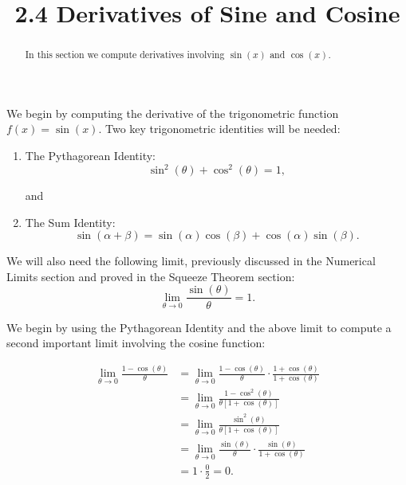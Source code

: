 \documentclass{ximera}
\title{2.4 Derivatives of Sine and Cosine}
\begin{document}
\begin{abstract}
In this section we compute derivatives involving $\sin(x)$ and $\cos(x)$.
\end{abstract}

\maketitle


We begin by computing the derivative of the trigonometric function $f(x) = \sin(x)$.  
Two key trigonometric identities will be needed:
\begin{enumerate}
\item The Pythagorean Identity:
\[
\sin^2(\theta) + \cos^2(\theta) = 1,
\]
\begin{center}
and
\end{center}
\item The Sum Identity:
\[
\sin(\alpha + \beta) = \sin(\alpha)\cos(\beta) + \cos(\alpha)\sin(\beta).
\]
\end{enumerate}

We will also need the following limit, previously discussed in the Numerical Limits section and proved in the Squeeze Theorem section:
\[
\lim_{\theta \to 0} \frac{\sin(\theta)}{\theta} = 1.
\]

We begin by using  the Pythagorean Identity and the above limit
to compute a second important limit involving the cosine function:

\begin{align*}
\lim_{\theta \to 0} \frac{1 - \cos(\theta)}{\theta} &= \lim_{\theta \to 0} \frac{1 - \cos(\theta)}{\theta} \cdot \frac{1 + \cos(\theta)}{1 + \cos(\theta)}\\
&= \lim_{\theta \to 0} \frac{1 - \cos^2(\theta)}{\theta[1 + \cos(\theta)]}\\
&= \lim_{\theta \to 0} \frac{\sin^2(\theta)}{\theta[1 + \cos(\theta)]}\\
&= \lim_{\theta \to 0} \frac{\sin(\theta)}{\theta} \cdot \frac{\sin(\theta)}{1 + \cos(\theta)}\\
&= 1 \cdot \frac{0}{2} = 0.
\end{align*}
\end{document}
